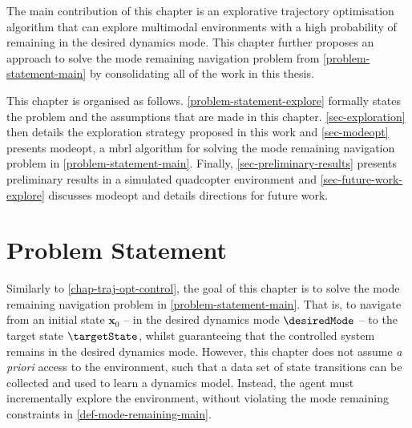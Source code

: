 \documentclass{mimosis-class/mimosis}
\numberwithin{equation}{chapter}
\newcommand{\state}{\ensuremath{\mathbf{x}}}
\begin{document}
{The main contribution of this chapter is an explorative trajectory optimisation algorithm
that can explore multimodal environments with a high probability of remaining in the desired dynamics mode.
This chapter further proposes an approach to solve the mode remaining navigation problem from \cref{problem-statement-main}
by consolidating all of the work in this thesis.

This chapter is organised as follows.
\cref{problem-statement-explore} formally states the problem and the assumptions that are made in this chapter.
\cref{sec-exploration} then details the exploration strategy proposed in this work and
\cref{sec-modeopt} presents \acrfull{modeopt}, a \acrshort{mbrl} algorithm for
solving the mode remaining navigation problem in \cref{problem-statement-main}.
Finally, \cref{sec-preliminary-results} presents preliminary results in a simulated
quadcopter environment and \cref{sec-future-work-explore} discusses \acrshort{modeopt} and
details directions for future work.
\section{Problem Statement \label{problem-statement-explore}}
\label{sec:org2971766}
Similarly to \cref{chap-traj-opt-control}, the goal of this chapter is to solve the mode
remaining navigation problem in \cref{problem-statement-main}.
That is, to navigate from an initial state \(\state_0\) -- in the desired dynamics mode \(\desiredMode\)
-- to the target state \(\targetState\), whilst guaranteeing that the controlled
system remains in the desired dynamics mode.
However, this chapter does not assume \emph{a priori} access to the environment, such that a data set of state transitions
can be collected and used to learn a dynamics model.
Instead, the agent must incrementally explore the environment, without violating the mode remaining constraints
in \cref{def-mode-remaining-main}.

}
\end{document}

